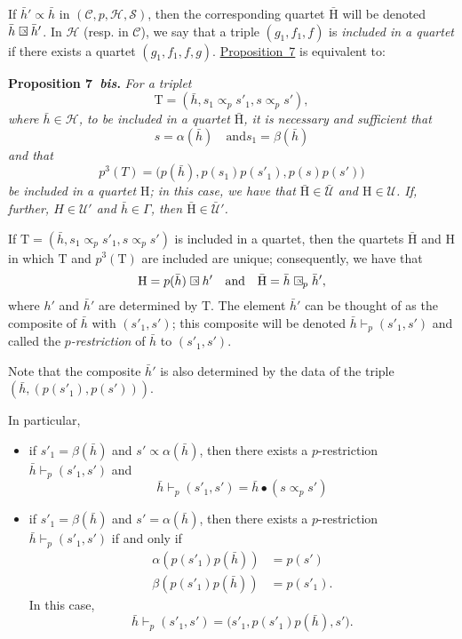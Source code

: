 \documentclass[a4paper,oneside,nobib,nofonts,notitlepage,notoc,nols,fleqn,justified]{tufte-book}
\newenvironment{itenv}[1]
  {\phantomsection\par\medskip\noindent\textbf{#1.}\itshape}
  {\par\medskip}
\newcommand{\oldpage}[1]{{\reversemarginpar\marginnote{\raggedleft\footnotesize\textit{p.~#1}}}}
\newcommand{\CC}{\mathcal{C}}
\newcommand{\HH}{\mathcal{H}}
\newcommand{\rHH}{\mathrm{H}}
\renewcommand{\SS}{\mathcal{S}}
\newcommand{\UU}{\mathcal{U}}
\newcommand{\subs}{\mathrel{\propto}}
\newcommand{\sqsubs}{\mathrel{\mathrlap{\square}\raisebox{.17em}{\scaleobj{0.65}{\,\,\propto}}}}
\begin{document}
If $\bar{h}'\subs\bar{h}$ in $(\CC,p,\HH,\SS)$, then the corresponding quartet $\bar{\rHH}$ will be denoted $\bar{h}\sqsubs\bar{h}'$.
In $\HH$ (resp. in $\CC$), we say that a triple $(g_1,f_1,f)$  is \emph{included in a quartet} if there exists a quartet $(g_1,f_1,f,g)$.
\hyperref[proposition:i-7]{Proposition~7} is equivalent to:

\begin{itenv}{Proposition 7~\emph{bis}}
\label{proposition:i-7bis}
  For a triplet
  \[
    \mathrm{T}
    = (\bar{h},s_1\subs_p s'_1, s\subs_p s'),
  \]
  where $\bar{h}\in\HH$, to be included in a quartet $\bar{\rHH}$, it is necessary and sufficient that
  \[
    s=\alpha(\bar{h})
    \quad\text{and}
    s_1=\beta(\bar{h})
  \]
  and that
  \[
    p^3(T)
    = \big(
      p(\bar{h}), p(s_1)p(s'_1), p(s)p(s')
    \big)
  \]
  be included in a quartet $\rHH$;
  in this case, we have that $\bar{\rHH}\in\bar{\UU}$ and $\rHH\in\UU$.
  If, further, $H\in\UU'$ and $\bar{h}\in\Gamma$, then $\bar{\rHH}\in\bar{\UU}'$.
\end{itenv}

If $\mathrm{T}=(\bar{h},s_1\subs_p s'_1,s\subs_p s')$ is included in a quartet, then the quartets $\bar{\rHH}$ and $\rHH$ in which $\mathrm{T}$ and $p^3(\mathrm{T})$ are included are unique;
consequently, we have that
\[
  \rHH = p(\bar{h})\sqsubs h'
  \quad\text{and}\quad
  \bar{\rHH} = \bar{h}\sqsubs_p \bar{h}',
\]
\oldpage{367}
where $h'$ and $\bar{h}'$ are determined by $\mathrm{T}$.
The element $\bar{h}'$ can be thought of as the composite of $\bar{h}$ with $(s'_1,s')$;
this composite will be denoted $\bar{h}\vdash_p(s'_1,s')$ and called the \emph{$p$-restriction} of $\bar{h}$ to $(s'_1,s')$.

Note that the composite $\bar{h}'$ is also determined by the data of the triple $(\bar{h},(p(s'_1),p(s')))$.

In particular,

\begin{itemize}
  \item if $s'_1=\beta(\bar{h})$ and $s'\subs\alpha(\bar{h})$, then there exists a $p$-restriction $\bar{h}\vdash_p(s'_1,s')$ and
    \[
      \bar{h}\vdash_p(s'_1,s')
      = \bar{h}\bullet(s\subs_p s')
    \]
  \item if $s'_1=\beta(\bar{h})$ and $s'=\alpha(\bar{h})$, then there exists a $p$-restriction $\bar{h}\vdash_p(s'_1,s')$ if and only if
    \[
      \begin{aligned}
        \alpha(p(s'_1)p(\bar{h}))
        &= p(s')
      \\\beta(p(s'_1)p(\bar{h}))
        &= p(s'_1).
      \end{aligned}
    \]
    In this case,
    \[
      \bar{h}\vdash_p(s'_1,s')
      = \big(
        s'_1, p(s'_1)p(\bar{h}), s'
      \big).
    \]
\end{itemize}
\end{document}
